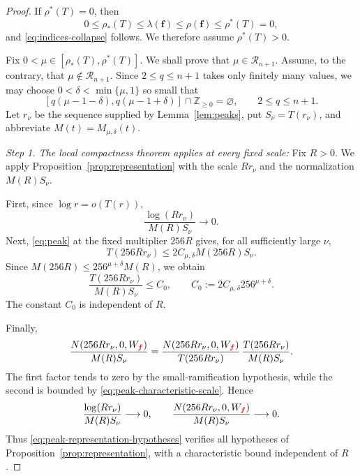 \documentclass[12pt,letterpaper,reqno]{amsart}
\theoremstyle{definition}
\numberwithin{equation}{section}
\newcommand{\Z}{\mathbb Z}
\newcommand{\Gn}{\mathcal R_{n+1}}
\newcommand{\fv}{\bm f}
\newcommand{\revision}[1]{\textcolor{red}{#1}}
\begin{document}
\begin{proof}

If \(\rho^*(T)=0\), then
\[
0\leq
\rho_*(T)
\leq
\lambda(\fv)
\leq
\rho(\fv)
\leq
\rho^*(T)=0,
\]
and \eqref{eq:indices-collapse} follows. We therefore assume
\(\rho^*(T)>0\).

Fix
$
0<\mu\in[\rho_*(T),\rho^*(T)].
$
We shall prove that \(\mu\in\Gn\).
Assume, to the contrary, that \(\mu\notin\Gn\). Since
\(2\leq q\leq n+1\) takes only finitely many values, we may choose
\(0<\delta<\min\{\mu,1\}\) so small that
\begin{equation}\label{eq:no-integer-window}
 [q(\mu-1-\delta),q(\mu-1+\delta)]
 \cap\Z_{\geq0}
 =
 \varnothing,
 \qquad
 2\leq q\leq n+1.
\end{equation}
Let \(r_\nu\) be the sequence supplied by
Lemma~\ref{lem:peaks}, put \(S_\nu=T(r_\nu)\), and abbreviate
\(M(t)=M_{\mu,\delta}(t)\).


\medskip\noindent
\emph{{Step 1. The local compactness theorem applies at every fixed scale:}}
Fix \(R>0\). We apply Proposition~\ref{prop:representation} with
the scale \(Rr_\nu\) and the normalization \(M(R)S_\nu\).

First, since \(\log r=o(T(r))\),
\[
\frac{\log(Rr_\nu)}{M(R)S_\nu}\longrightarrow0.
\]
Next, \eqref{eq:peak} at the fixed multiplier \(256R\) gives, for all
sufficiently large \(\nu\),
\[
T(256Rr_\nu)
\leq
2C_{\mu,\delta}M(256R)S_\nu.
\]
Since
\(M(256R)\leq256^{\mu+\delta}M(R)\), we obtain
\begin{equation}\label{eq:peak-characteristic-scale}
 \frac{T(256Rr_\nu)}{M(R)S_\nu}
 \leq
 C_0,
 \qquad
 C_0:=2C_{\mu,\delta}256^{\mu+\delta}.
\end{equation}
The constant \(C_0\) is independent of \(R\).

Finally,
\[
\frac{N(256Rr_\nu,0,W_{\revision{\fv}})}{M(R)S_\nu}
=
\frac{N(256Rr_\nu,0,W_{\revision{\fv}})}
     {T(256Rr_\nu)}
\,
\frac{T(256Rr_\nu)}
     {M(R)S_\nu}.
\]
The first factor tends to zero by the small-ramification hypothesis,
while the second is bounded by \eqref{eq:peak-characteristic-scale}.
Hence
\begin{equation}\label{eq:peak-representation-hypotheses}
 \frac{\log(Rr_\nu)}{M(R)S_\nu}\longrightarrow0,
 \qquad
 \frac{N(256Rr_\nu,0,W_{\revision{\fv}})}
      {M(R)S_\nu}
 \longrightarrow0.
\end{equation}
Thus \eqref{eq:peak-representation-hypotheses} verifies all hypotheses
of Proposition~\ref{prop:representation},
with a characteristic bound independent of \(R\).




\end{proof}
\end{document}
